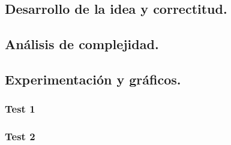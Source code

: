 \vspace*{0.6cm}

\subsection{Desarrollo de la idea y correctitud.}

\vspace*{0.3cm}



\vspace*{0.6cm}






\subsection{Análisis de complejidad.}

\vspace*{0.3cm}


\vspace*{0.6cm}

\subsection{Experimentación y gráficos.}


\subsubsection{Test 1}

\vspace*{0.3cm}


\vspace*{0.6cm}

\subsubsection{Test 2}


\newpage
